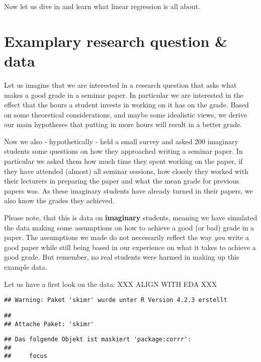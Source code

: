 \documentclass[
]{book}
\begin{document}
Now let us dive in and learn what linear regression is all about.

\hypertarget{examplary-research-question-data}{%
\section{Examplary research question \& data}\label{examplary-research-question-data}}

Let us imagine that we are interested in a research question that asks what
makes a good grade in a seminar paper. In particular we are interested in the
effect that the hours a student invests in working on it has on the grade. Based
on some theoretical considerations, and maybe some idealistic views, we derive
our main hypotheses that putting in more hours will result in a better grade.

Now we also - hypothetically - held a small survey and asked 200 imaginary
students some questions on how they approached writing a seminar paper. In
particular we asked them how much time they spent working on the paper, if they
have attended (almost) all seminar sessions, how closely they worked with their
lecturers in preparing the paper and what the mean grade for previous papers
was. As these imaginary students have already turned in their papers, we also
know the grades they achieved.

Please note, that this is data on \textbf{imaginary} students, meaning we have
simulated the data making some assumptions on how to achieve a good (or bad)
grade in a paper. The assumptions we made do not necessarily reflect the way
\emph{you} write a good paper while still being based in our experience on what it
takes to achieve a good grade. But remember, no real students were harmed in
making up this example data.

Let us have a first look on the data:
XXX ALIGN WITH EDA XXX

\begin{verbatim}
## Warning: Paket 'skimr' wurde unter R Version 4.2.3 erstellt
\end{verbatim}

\begin{verbatim}
## 
## Attache Paket: 'skimr'
\end{verbatim}

\begin{verbatim}
## Das folgende Objekt ist maskiert 'package:corrr':
## 
##     focus
\end{verbatim}
\end{document}
